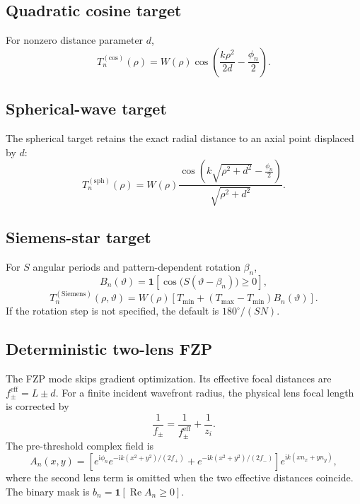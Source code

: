 \documentclass[11pt,a4paper]{article}
\newcommand{\ii}{\mathrm{i}}
\begin{document}
\subsection{Quadratic cosine target}
For nonzero distance parameter $d$,
\begin{equation}
 T_n^{(\mathrm{cos})}(\rho)=W(\rho)
 \cos\!\left(\frac{k\rho^2}{2d}-\frac{\phi_n}{2}\right).
 \label{eq:cos-target}
\end{equation}

\subsection{Spherical-wave target}
The spherical target retains the exact radial distance to an axial point displaced by $d$:
\begin{equation}
 T_n^{(\mathrm{sph})}(\rho)=W(\rho)
 \frac{\cos\!\left(k\sqrt{\rho^2+d^2}-\frac{\phi_n}{2}\right)}{\sqrt{\rho^2+d^2}}.
 \label{eq:sph-target}
\end{equation}

\subsection{Siemens-star target}
For $S$ angular periods and pattern-dependent rotation $\beta_n$,
\begin{equation}
 B_n(\vartheta)=\mathbf 1\!\left[\cos\big(S(\vartheta-\beta_n)\big)\geq0\right],
\end{equation}
\begin{equation}
 T_n^{(\mathrm{Siemens})}(\rho,\vartheta)=W(\rho)
 \left[T_{\min}+(T_{\max}-T_{\min})B_n(\vartheta)\right].
\end{equation}
If the rotation step is not specified, the default is $180^\circ/(SN)$.

\subsection{Deterministic two-lens FZP}
The FZP mode skips gradient optimization. Its effective focal distances are $f_{\pm}^{\mathrm{eff}}=L\pm d$. For a finite incident wavefront radius, the physical lens focal length is corrected by
\begin{equation}
 \frac{1}{f_{\pm}}=\frac{1}{f_{\pm}^{\mathrm{eff}}}+\frac{1}{z_i}.
\end{equation}
The pre-threshold complex field is
\begin{equation}
 A_n(x,y)=\left[
 e^{\ii\phi_n}e^{-\ii k(x^2+y^2)/(2f_+)}+
 e^{-\ii k(x^2+y^2)/(2f_-)}
 \right]e^{\ii k(xn_x+yn_y)},
\end{equation}
where the second lens term is omitted when the two effective distances coincide. The binary mask is $b_n=\mathbf 1[\operatorname{Re}A_n\geq0]$.
\end{document}
